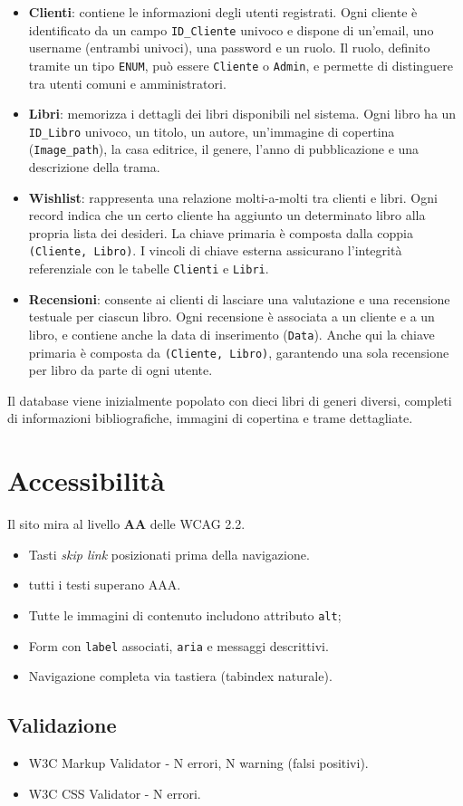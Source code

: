 \documentclass{article}
\begin{document}
\begin{itemize}
    \item \textbf{Clienti}: contiene le informazioni degli utenti registrati. Ogni cliente è identificato da un campo \texttt{ID\_Cliente} univoco e dispone di un'email, uno username (entrambi univoci), una password e un ruolo. Il ruolo, definito tramite un tipo \texttt{ENUM}, può essere \texttt{Cliente} o \texttt{Admin}, e permette di distinguere tra utenti comuni e amministratori.
    
    \item \textbf{Libri}: memorizza i dettagli dei libri disponibili nel sistema. Ogni libro ha un \texttt{ID\_Libro} univoco, un titolo, un autore, un'immagine di copertina (\texttt{Image\_path}), la casa editrice, il genere, l'anno di pubblicazione e una descrizione della trama.
    
    \item \textbf{Wishlist}: rappresenta una relazione molti-a-molti tra clienti e libri. Ogni record indica che un certo cliente ha aggiunto un determinato libro alla propria lista dei desideri. La chiave primaria è composta dalla coppia \texttt{(Cliente, Libro)}. I vincoli di chiave esterna assicurano l'integrità referenziale con le tabelle \texttt{Clienti} e \texttt{Libri}.
    
    \item \textbf{Recensioni}: consente ai clienti di lasciare una valutazione e una recensione testuale per ciascun libro. Ogni recensione è associata a un cliente e a un libro, e contiene anche la data di inserimento (\texttt{Data}). Anche qui la chiave primaria è composta da \texttt{(Cliente, Libro)}, garantendo una sola recensione per libro da parte di ogni utente.
\end{itemize}

Il database viene inizialmente popolato con dieci libri di generi diversi, completi di informazioni bibliografiche, immagini di copertina e trame dettagliate.


\section{Accessibilità}
Il sito mira al livello \textbf{AA} delle WCAG 2.2.

\begin{itemize}
    \item Tasti \emph{skip link} posizionati prima della navigazione.
    \item tutti i testi superano AAA.
    \item Tutte le immagini di contenuto includono attributo \texttt{alt};
    \item Form con \texttt{label} associati, \texttt{aria} e messaggi descrittivi.
    \item Navigazione completa via tastiera (tabindex naturale).
\end{itemize}


\subsection{Validazione}
\begin{itemize}
    \item W3C Markup Validator - N errori, N warning (falsi positivi).
    \item W3C CSS Validator - N errori.
\end{itemize}
\end{document}
